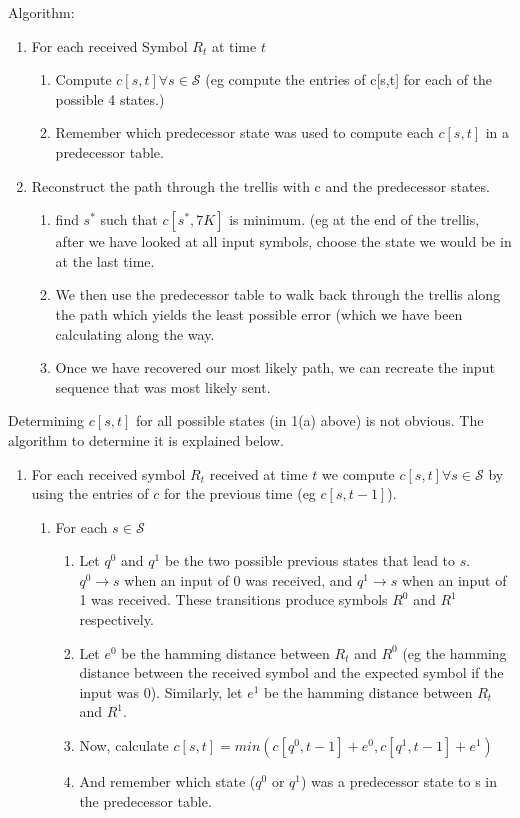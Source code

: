 \documentclass{article}
\begin{document}
Algorithm:
\begin{enumerate}
\item For each received Symbol $R_t$ at time $t$
	\begin{enumerate}
	\item Compute $c[s,t] \forall s \in \mathcal{S}$ (eg compute the entries
 	       of c[s,t] for each of the possible 4 states.)
	\item Remember which predecessor state was used to compute each $c[s,t]$ in
	       a predecessor table.
	\end{enumerate}
\item Reconstruct the path through the trellis with c and the predecessor states.
	\begin{enumerate}
	\item find $s^*$ such that $c[s^*,7K]$ is minimum. (eg at the end of the trellis, 
	       after we have looked at all input symbols, choose the state we would 
	       be in at the last time. 
	\item We then use the predecessor table to walk back through the trellis
	       along the path which yields the least possible error (which we have 
	       been calculating along the way.
	\item Once we have recovered our most likely path, we can recreate the
	       input sequence that was most likely sent.
	\end{enumerate} 
\end{enumerate}

Determining $c[s,t]$ for all possible states (in 1(a) above) is not obvious.
The algorithm to determine it is explained below.  

\begin{enumerate}
\item For each received symbol $R_t$ received at time $t$ we compute 
       $c[s,t] \forall s \in \mathcal{S}$ by using the entries of $c$ for 
       the previous time (eg $c[s,t-1]$).
	\begin{enumerate}
	\item For each $s \in \mathcal{S}$
		\begin{enumerate}
		\item Let $q^0$ and $q^1$ be the two possible previous states
		       that lead to $s$. $q^0\rightarrow s$ when an input of 0
		       was received, and $q^1\rightarrow s$ when an input of 1 
		       was received. These transitions produce symbols $R^0$ and $R^1$
		       respectively.
		\item Let $e^0$ be the hamming distance between $R_t$ and $R^0$ (eg the hamming
		       distance between the received symbol and the expected symbol if the input was 0). 
		       Similarly, let $e^1$ be the hamming distance between $R_t$ and $R^1$.
		\item Now, calculate $c[s,t] = min(c[q^0,t-1] + e^0, c[q^1,t-1] + e^1)$
		\item And remember which state ($q^0$ or $q^1$) was a predecessor state to s in the 
		       predecessor table.
		\end{enumerate}
	\end{enumerate}
\end{enumerate}
\end{document}
